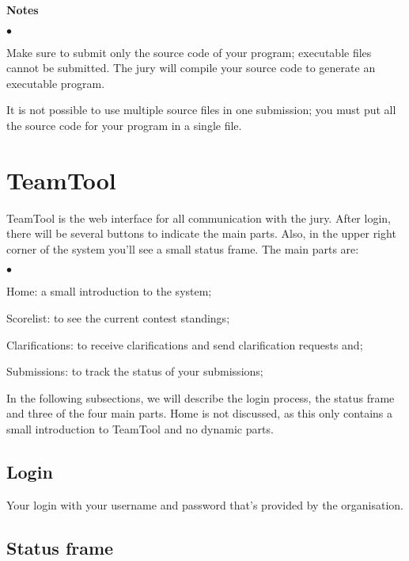 \documentclass[a4paper,12pt]{article}
\newcommand{\strong}[1]{\textbf{#1}}
\newenvironment{citemize}
  {\begin{list}{$\bullet$}{\topsep 0cm \itemsep 0cm}}
  {\end{list}}
\begin{document}
\strong{Notes}
\begin{citemize}
\item Make sure to submit only the source code of your program; executable
files cannot be submitted. The jury will compile your source code to
generate an executable program.

\item It is not possible to use multiple source files in one submission; you
must put all the source code for your program in a single file.
\end{citemize}

\section{TeamTool}

TeamTool is the web interface for all communication with the jury. After
login, there will be several buttons to indicate the main parts. Also, in
the upper right corner of the system you'll see a small status frame. The
main parts are:

\begin{citemize}
\item[Home:] a small introduction to the system;

\item[Scorelist:] to see the current contest standings;

\item[Clarifications:] to receive clarifications and send clarification
requests and;

\item[Submissions:] to track the status of your submissions;
\end{citemize}

In the following subsections, we will describe the login process, the status
frame and three of the four main parts. Home is not discussed, as this only
contains a small introduction to TeamTool and no dynamic parts.

\subsection{Login}

Your login with your username and password that's provided by the
organisation.

\subsection{Status frame}
\end{document}
